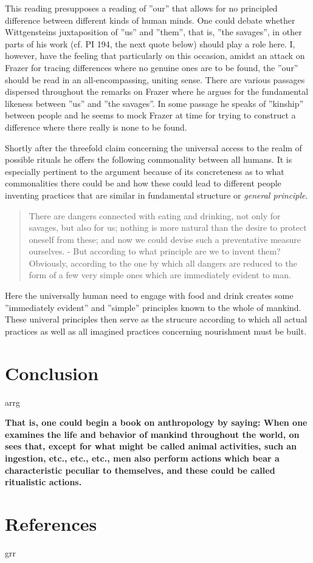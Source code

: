 \documentclass{article}
\begin{document}
This reading presupposes a reading of ''our'' that allows for no principled difference between different kinds of human minds. One could debate whether Wittgensteins juxtaposition of ''us'' and ''them'', that is, ''the savages'', in other parts of his work (cf. PI 194, the next quote below) should play a role here. I, however, have the feeling that particularly on this occasion, amidst an attack on Frazer for tracing differences where no genuine ones are to be found, the ''our'' should be read in an all-encompassing, uniting sense. There are various passages dispersed throughout the remarks on Frazer where he argues for the fundamental likeness between ''us'' and ''the savages''. In some passage he speaks of ''kinship'' between people and he seems to mock Frazer at time for trying to construct a difference where there really is none to be found. 

Shortly after the threefold claim concerning the universal access to the realm of possible rituals he offers the following commonality between all humans. It is especially pertinent to the argument because of its concreteness as to what commonalities there could be and how these could lead to different people inventing practices that are similar in fundamental structure or \textit{general principle}.
\begin{quote}
There are dangers connected with eating and drinking, not only for savages, but also for us; nothing is more natural than the desire to protect oneself from these; and now we could devise such a preventative measure ourselves. - But according to what principle are we to invent them? Obviously, according to the one by which all dangers are reduced to the form of a few very simple ones which are immediately evident to man.
\end{quote}
Here the universally human need to engage with food and drink creates some ''immediately evident'' and ''simple'' principles known to the whole of mankind. These univeral principles then serve as the strucure according to which all actual practices as well as all imagined practices concerning nourishment must be built.



\section{Conclusion}
\hypertarget{sec4}{arrg}
\textbf{That is, one could begin a book on anthropology by saying: When one examines the life and behavior of mankind throughout the world, on sees that, except for what might be called animal activities, such an ingestion, etc., etc., etc., men also perform actions which bear a characteristic peculiar to themselves, and these could be called ritualistic actions.}

\section{References}
\hypertarget{sec5}{grr}
\end{document}
